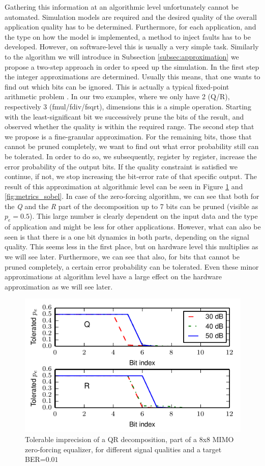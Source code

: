 \documentclass[conference]{IEEEtran}
\begin{document}
Gathering this information at an algorithmic level unfortunately cannot be automated. Simulation models are required and the desired quality of the overall application quality has to be determined. Furthermore, for each application, and the type on how the model is implemented, a method to inject faults has to be developed. However, on software-level this is usually a very simple task. Similarly to the algorithm we will introduce in Subsection \ref{subsec:approximation} we propose a two-step approach in order to speed up the simulation. In the first step the integer approximations are determined. Usually this means, that one wants to find out which bits can be ignored. This is actually a typical fixed-point arithmetic problem \cite{yates2009fixed}. In our two examples, where we only have 2 (Q/R), respectively 3 (fmul/fdiv/fsqrt), dimensions this is a simple operation. Starting with the least-significant bit we successively prune the bits of the result, and observed whether the quality is within the required range. The second step that we propose is a fine-granular approximation. For the remaining bits, those that cannot be pruned completely, we want to find out what error probability still can be tolerated. In order to do so, we subsequently, register by register, increase the error probability of the output bits. If the quality constraint is satisfied we continue, if not, we stop increasing the bit-error rate of that specific output. The result of this approximation at algorithmic level can be seen in Figure \ref{fig:metrics_qr} and \ref{fig:metrics_sobel}. In case of the zero-forcing algorithm, we can see that both for the \emph{Q} and the \emph{R} part of the decomposition up to 7 bits can be pruned (visible as $p_e=0.5$). This large number is clearly dependent on the input data and the type of application and might be less for other applications. However, what can also be seen is that there is a one bit dynamics in both parts, depending on the signal quality. This seems less in the first place, but on hardware level this multiplies as we will see later. Furthermore, we can see that also, for bits that cannot be pruned completely, a certain error probability can be tolerated. Even these minor approximations at algorithm level have a large effect on the hardware approximation as we will see later.
\begin{figure}[tb]
  \centering
  \includegraphics[width=.48\textwidth]{figs/metrics_qr}
  \caption{Tolerable imprecision of a QR decomposition, part of a 8x8 MIMO zero-forcing equalizer, for different signal qualities and a target BER=$0.01$}
  \label{fig:metrics_qr}
\end{figure}
\end{document}
